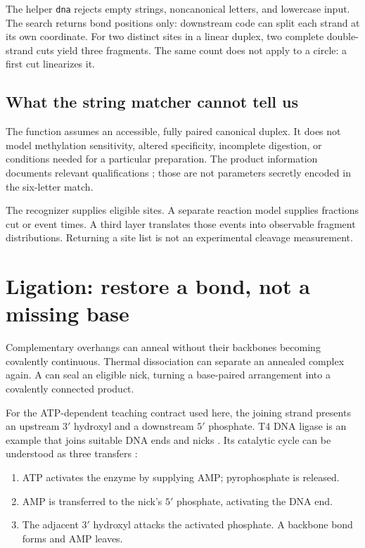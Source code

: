 
The helper \texttt{dna} rejects empty strings, noncanonical letters, and lowercase input. The search returns bond positions only: downstream code can split each strand at its own coordinate. For two distinct sites in a linear duplex, two complete double-strand cuts yield three fragments. The same count does not apply to a circle: a first cut linearizes it.

\subsection{What the string matcher cannot tell us}

The function assumes an accessible, fully paired canonical duplex. It does not model methylation sensitivity, altered specificity, incomplete digestion, or conditions needed for a particular preparation. The product information documents relevant qualifications \cite{ecori}; those are not parameters secretly encoded in the six-letter match.

The recognizer supplies eligible sites. A separate reaction model supplies fractions cut or event times. A third layer translates those events into observable fragment distributions. Returning a site list is not an experimental cleavage measurement.

\section{Ligation: restore a bond, not a missing base}

Complementary overhangs can anneal without their backbones becoming covalently continuous. Thermal dissociation can separate an annealed complex again. A  can seal an eligible nick, turning a base-paired arrangement into a covalently connected product.

For the ATP-dependent teaching contract used here, the joining strand presents an upstream $3'$ hydroxyl and a downstream $5'$ phosphate. T4 DNA ligase is an example that joins suitable DNA ends and nicks \cite{ligase}. Its catalytic cycle can be understood as three transfers \cite{ligasemechanism}:

\begin{enumerate}
\item ATP activates the enzyme by supplying AMP; pyrophosphate is released.
\item AMP is transferred to the nick's $5'$ phosphate, activating the DNA end.
\item The adjacent $3'$ hydroxyl attacks the activated phosphate. A backbone bond forms and AMP leaves.
\end{enumerate}

